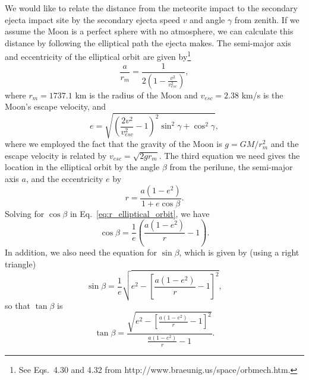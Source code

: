 \documentclass{hitec}
\begin{document}
We would like to relate the distance from the meteorite impact to the secondary ejecta impact site by the secondary ejecta speed $v$ and angle $\gamma$ from zenith. If we assume the Moon is a perfect sphere with no atmosphere, we can calculate this distance by following the elliptical path the ejecta makes. The semi-major axis and eccentricity of the elliptical orbit are given by\footnote{See Eqs.\ 4.30 and 4.32 from http://www.braeunig.us/space/orbmech.htm.}
\begin{equation}\label{eq:a_of_v}
\frac{a}{r_m} = \frac{1}{2\left(1-\frac{v^2}{v_{esc}^2}\right)},
\end{equation}
where $r_m = 1737.1$ km is the radius of the Moon and $v_{esc} = 2.38$ km/s is the Moon's escape velocity, and
\begin{equation}\label{eq:e_of_v}
e = \sqrt{\left(\frac{2v^2}{v_{esc}^2}-1\right)^2\sin^2\gamma + \cos^2\gamma},
\end{equation}
where we employed the fact that the gravity of the Moon is $g = GM/r_m^2$ and the escape velocity is related by $v_{esc} = \sqrt{2gr_m}$. The third equation we need gives the location in the elliptical orbit by the angle $\beta$ from the perilune, the semi-major axis $a$, and the eccentricity $e$ by
\begin{equation}\label{eq:r_elliptical_orbit}
r = \frac{a(1-e^2)}{1+e\cos\beta}.
\end{equation}
Solving for $\cos\beta$ in Eq.\ \ref{eq:r_elliptical_orbit}, we have
\begin{equation}\label{eq:cos_elliptical_orbit}
\cos\beta = \frac{1}{e}\left(\frac{a(1-e^2)}{r}-1\right).
\end{equation}
In addition, we also need the equation for $\sin\beta$, which is given by (using a right triangle)
\begin{equation}
\sin\beta = \frac{1}{e}\sqrt{e^2-\left[\frac{a(1-e^2)}{r}-1\right]^2},
\end{equation}
so that $\tan\beta$ is
\begin{equation}\label{eq:tan_beta}
\tan\beta = \frac{\sqrt{e^2-\left[\frac{a(1-e^2)}{r}-1\right]^2}}{\frac{a(1-e^2)}{r}-1}.
\end{equation}
\end{document}
